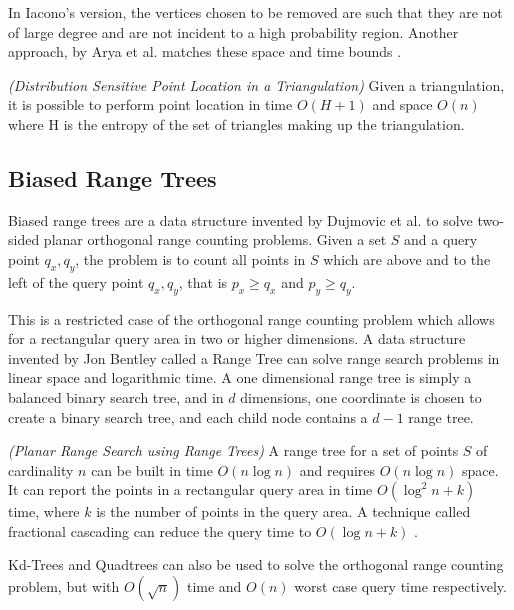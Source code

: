 \documentclass[mcs]{scsthesis}
\begin{document}
In Iacono's version, the vertices chosen to be removed are such that they are
not of large degree and are not incident to a high probability region. Another
approach, by Arya et al. matches these space and time bounds \cite{simpleentropy}.

\begin{thm} \emph{(Distribution Sensitive Point Location in a Triangulation)} 
Given a triangulation, it is possible to perform point location in time
\(O(H + 1)\) and space \(O(n)\) where H is the entropy of the set of triangles
making up the triangulation. 
\end{thm}

\subsection{Biased Range Trees}

Biased range trees are a data structure invented by Dujmovic et al.
\cite{biasedrange} to solve two-sided planar orthogonal range counting problems.
Given a set \(S\) and a query point \(q_x, q_y\), the problem is to count all
points in \(S\) which are above and to the left of the query point
\(q_x, q_y\), that is \(p_x \ge q_x\) and \(p_y \ge q_y\).

This is a restricted case of the orthogonal range counting problem which allows
for a rectangular query area in two or higher dimensions. A data structure
invented by Jon Bentley \cite{rangetree} called a Range Tree can solve range
search problems in linear space and logarithmic time. A one dimensional range
tree is simply a balanced binary search tree, and in \(d\) dimensions, one
coordinate is chosen to create a binary search tree, and each child node
contains a \(d - 1\) range tree. 

\begin{thm} \emph{(Planar Range Search using Range Trees)} 
A range tree for a set of points \(S\) of cardinality \(n\) can be built in
time \(O(n \log n)\) and requires \(O(n \log n)\) space. It can report the
points in a rectangular query area in time \(O(\log^2 n + k)\) time, where
\(k\) is the number of points in the query area. A technique called
fractional cascading can reduce the query time to \(O(\log n + k)\)
\cite{dutch}. 
\end{thm}

Kd-Trees and Quadtrees can also be used to solve the orthogonal range counting
problem, but with \(O(\sqrt n)\) time and \(O(n)\) worst case query time
respectively.
\end{document}
